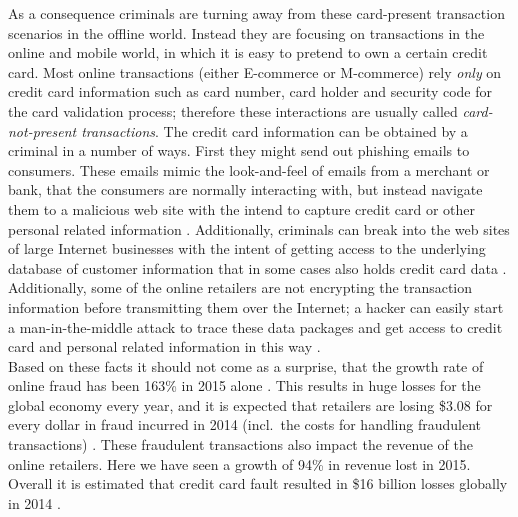 As a consequence criminals are turning away from these card-present transaction scenarios in the offline world. Instead they are focusing on transactions in the online and mobile world, in which it is easy to pretend to own a certain credit card. Most online transactions (either \gls{E-commerce} or \gls{M-commerce}) rely \emph{only} on credit card information such as card number, card holder and security code for the card validation process; therefore these interactions are usually called \emph{card-not-present transactions}. The credit card information can be obtained by a criminal in a number of ways. First they might send out phishing emails to consumers. These emails mimic the look-and-feel of emails from a merchant or bank, that the consumers are normally interacting with, but instead navigate them to a malicious web site with the intend to capture credit card or other personal related information \citep{ConsumerAction2009}. Additionally, criminals can break into the web sites of large Internet businesses with the intent of getting access to the underlying database of customer information that in some cases also holds credit card data \citep{Holmes2015}. Additionally, some of the online retailers are not encrypting the transaction information before transmitting them over the Internet; a hacker can easily start a man-in-the-middle attack to trace these data packages and get access to credit card and personal related information in this way \citep{Captain2015}. \\

Based on these facts it should not come as a surprise, that the growth rate of online fraud has been 163\% in 2015 alone \citep{PYMNTS2016}. This results in huge losses for the global economy every year, and it is expected that retailers are losing \$3.08 for every dollar in fraud incurred in 2014 (incl.\ the costs for handling fraudulent transactions) \citep{Rampton2015}. These fraudulent transactions also impact the revenue of the online retailers. Here we have seen a growth of 94\% in revenue lost in 2015. Overall it is estimated that credit card fault resulted in \$16 billion losses globally in 2014 \citep{PYMNTS2016} \citep{BusinessWire2015}. \\

